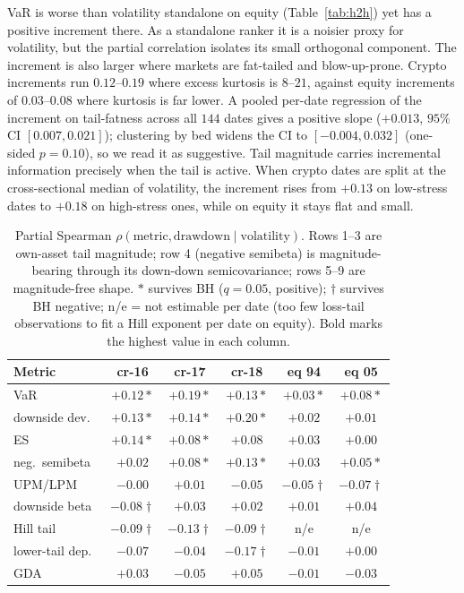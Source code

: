 \documentclass[sigconf,anonymous,nonacm]{acmart}
\begin{document}
VaR is worse than volatility
standalone on equity (Table~\ref{tab:h2h}) yet has a positive increment there.
As a standalone ranker it is a noisier proxy for volatility, but the partial
correlation isolates its small orthogonal component. The increment is also larger where
markets are fat-tailed and blow-up-prone. Crypto increments run $0.12$--$0.19$ where excess
kurtosis is $8$--$21$, against equity increments of $0.03$--$0.08$ where kurtosis is far
lower. A pooled per-date regression of the increment on tail-fatness across all $144$ dates
gives a positive slope ($+0.013$, $95\%$ CI $[0.007,0.021]$); clustering by bed widens the
CI to $[-0.004,0.032]$ (one-sided $p=0.10$), so we read it as suggestive. Tail magnitude
carries incremental information precisely when the tail is active. When crypto dates are
split at the cross-sectional median of volatility, the increment rises from $+0.13$ on
low-stress dates to $+0.18$ on high-stress ones, while on equity it stays flat and small.

\begin{table}[t]
\centering
\caption{Partial Spearman $\rho(\text{metric},\text{drawdown}\mid\text{volatility})$.
Rows 1--3 are own-asset tail magnitude; row 4 (negative semibeta) is magnitude-bearing
through its down-down semicovariance; rows 5--9 are magnitude-free shape. $\ast$ survives
BH ($q=0.05$, positive); $\dagger$ survives BH negative; n/e = not estimable per date
(too few loss-tail observations to fit a Hill exponent per date on equity). Bold marks the
highest value in each column.}
\label{tab:partials}
\small
\begin{tabular}{lccccc}
\toprule
Metric & cr-16 & cr-17 & cr-18 & eq 94 & eq 05 \\
\midrule
VaR & $+0.12\ast$ & $\mathbf{+0.19}\ast$ & $+0.13\ast$ & $\mathbf{+0.03}\ast$ & $\mathbf{+0.08}\ast$ \\
downside dev. & $+0.13\ast$ & $+0.14\ast$ & $\mathbf{+0.20}\ast$ & $+0.02$ & $+0.01$ \\
ES~\cite{rockafellar2000} & $\mathbf{+0.14}\ast$ & $+0.08\ast$ & $+0.08$ & $\mathbf{+0.03}$ & $+0.00$ \\
neg.\ semibeta~\cite{bpq2022} & $+0.02$ & $+0.08\ast$ & $+0.13\ast$ & $\mathbf{+0.03}$ & $+0.05\ast$ \\
UPM/LPM~\cite{violenawrocki2016} & $-0.00$ & $+0.01$ & $-0.05$ & $-0.05\dagger$ & $-0.07\dagger$ \\
downside beta~\cite{ang2006} & $-0.08\dagger$ & $+0.03$ & $+0.02$ & $+0.01$ & $+0.04$ \\
Hill tail~\cite{kellyjiang2014} & $-0.09\dagger$ & $-0.13\dagger$ & $-0.09\dagger$ & n/e & n/e \\
lower-tail dep.~\cite{chabiyo2018} & $-0.07$ & $-0.04$ & $-0.17\dagger$ & $-0.01$ & $+0.00$ \\
GDA~\cite{faragotedongap2018} & $+0.03$ & $-0.05$ & $+0.05$ & $-0.01$ & $-0.03$ \\
\bottomrule
\end{tabular}
\end{table}
\end{document}
